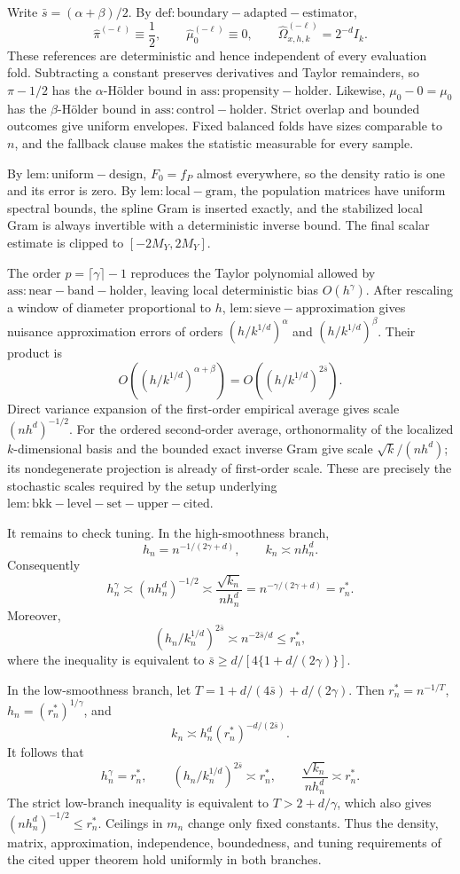 Write \(\bar s=(\alpha+\beta)/2\). By \(\mathrm{def:boundary-adapted-estimator}\),
\[
\widehat\pi^{(-\ell)}\equiv\frac12,
\qquad
\widehat\mu_0^{(-\ell)}\equiv0,
\qquad
\widehat\Omega^{(-\ell)}_{x,h,k}=2^{-d}I_k.
\]
These references are deterministic and hence independent of every evaluation fold. Subtracting a constant preserves derivatives and Taylor remainders, so \(\pi-1/2\) has the \(\alpha\)-Hölder bound in \(\mathrm{ass:propensity-holder}\). Likewise, \(\mu_0-0=\mu_0\) has the \(\beta\)-Hölder bound in \(\mathrm{ass:control-holder}\). Strict overlap and bounded outcomes give uniform envelopes. Fixed balanced folds have sizes comparable to \(n\), and the fallback clause makes the statistic measurable for every sample.

By \(\mathrm{lem:uniform-design}\), \(F_0=f_P\) almost everywhere, so the density ratio is one and its error is zero. By \(\mathrm{lem:local-gram}\), the population matrices have uniform spectral bounds, the spline Gram is inserted exactly, and the stabilized local Gram is always invertible with a deterministic inverse bound. The final scalar estimate is clipped to \([-2M_Y,2M_Y]\).

The order \(p=\lceil\gamma\rceil-1\) reproduces the Taylor polynomial allowed by \(\mathrm{ass:near-band-holder}\), leaving local deterministic bias \(O(h^\gamma)\). After rescaling a window of diameter proportional to \(h\), \(\mathrm{lem:sieve-approximation}\) gives nuisance approximation errors of orders \((h/k^{1/d})^\alpha\) and \((h/k^{1/d})^\beta\). Their product is
\[
O\!\left((h/k^{1/d})^{\alpha+\beta}\right)
=O\!\left((h/k^{1/d})^{2\bar s}\right).
\]
Direct variance expansion of the first-order empirical average gives scale \((nh^d)^{-1/2}\). For the ordered second-order average, orthonormality of the localized \(k\)-dimensional basis and the bounded exact inverse Gram give scale \(\sqrt{k}/(nh^d)\); its nondegenerate projection is already of first-order scale. These are precisely the stochastic scales required by the setup underlying \(\mathrm{lem:bkk-level-set-upper-cited}\).

It remains to check tuning. In the high-smoothness branch,
\[
h_n=n^{-1/(2\gamma+d)},
\qquad
k_n\asymp nh_n^d.
\]
Consequently
\[
h_n^\gamma\asymp(nh_n^d)^{-1/2}
\asymp\frac{\sqrt{k_n}}{nh_n^d}
=n^{-\gamma/(2\gamma+d)}=r_n^*.
\]
Moreover,
\[
(h_n/k_n^{1/d})^{2\bar s}\asymp n^{-2\bar s/d}\le r_n^*,
\]
where the inequality is equivalent to \(\bar s\ge d/[4\{1+d/(2\gamma)\}]\).

In the low-smoothness branch, let \(T=1+d/(4\bar s)+d/(2\gamma)\). Then \(r_n^*=n^{-1/T}\), \(h_n=(r_n^*)^{1/\gamma}\), and
\[
k_n\asymp h_n^d(r_n^*)^{-d/(2\bar s)}.
\]
It follows that
\[
h_n^\gamma=r_n^*,
\qquad
(h_n/k_n^{1/d})^{2\bar s}\asymp r_n^*,
\qquad
\frac{\sqrt{k_n}}{nh_n^d}\asymp r_n^*.
\]
The strict low-branch inequality is equivalent to \(T>2+d/\gamma\), which also gives \((nh_n^d)^{-1/2}\le r_n^*\). Ceilings in \(m_n\) change only fixed constants. Thus the density, matrix, approximation, independence, boundedness, and tuning requirements of the cited upper theorem hold uniformly in both branches.